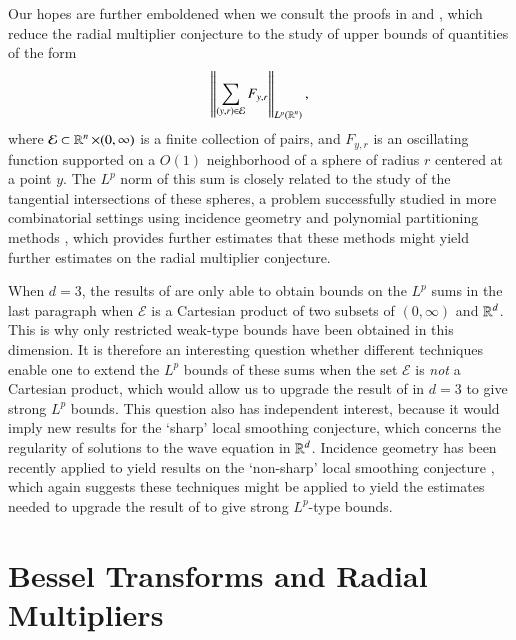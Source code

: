 Our hopes are further emboldened when we consult the proofs in \cite{HeoandNazarovandSeeger} and \cite{Cladek}, which reduce the radial multiplier conjecture to the study of upper bounds of quantities of the form
%
\[ \left\| \sum_{(y,r) \in \mathcal{E}} F_{y,r} \right\|_{L^p(\operatorname{\mathbb{R}}^n)}, \]
%
where $\mathcal{E} \subset \operatorname{\mathbb{R}}^n \times (0,\infty)$ is a finite collection of pairs, and $F_{y,r}$ is an oscillating function supported on a $O(1)$ neighborhood of a sphere of radius $r$ centered at a point $y$. The $L^p$ norm of this sum is closely related to the study of the tangential intersections of these spheres, a problem successfully studied in more combinatorial settings using incidence geometry and polynomial partitioning methods \cite{Zahl}, which provides further estimates that these methods might yield further estimates on the radial multiplier conjecture.

When $d = 3$, the results of \cite{Cladek} are only able to obtain bounds on the $L^p$ sums in the last paragraph when $\mathcal{E}$ is a Cartesian product of two subsets of $(0,\infty)$ and $\operatorname{\mathbb{R}}^d$. This is why only restricted weak-type bounds have been obtained in this dimension. It is therefore an interesting question whether different techniques enable one to extend the $L^p$ bounds of these sums when the set $\mathcal{E}$ is \emph{not} a Cartesian product, which would allow us to upgrade the result of \cite{Cladek} in $d = 3$ to give strong $L^p$ bounds. This question also has independent interest, because it would imply new results for the `sharp' local smoothing conjecture, which concerns the regularity of solutions to the wave equation in $\operatorname{\mathbb{R}}^d$. Incidence geometry has been recently applied to yield results on the `non-sharp' local smoothing conjecture \cite{GuthandWangandZhang}, which again suggests these techniques might be applied to yield the estimates needed to upgrade the result of \cite{Cladek} to give strong $L^p$-type bounds.

\section{Bessel Transforms and Radial Multipliers}
\label{besselequivalencesection}

